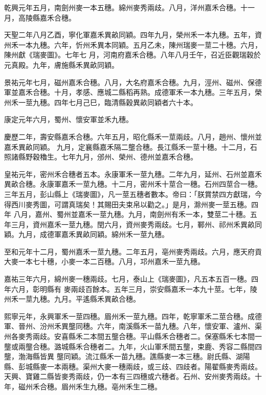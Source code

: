\begin{pinyinscope}
 乾興元年五月，南劍州麥一本五穗。綿州麥秀兩歧。八月，洋州嘉禾合穗。十一月，高陵縣嘉禾合穗。



 天聖二年八月乙酉，寧化軍嘉禾異畝同穎。四年九月，榮州禾一本九穗。五年，資州禾一本九穗。六年，忻州禾異本同穎。五月乙未，陳州瑞麥一莖二十穗。六月，陳州獻《瑞麥圖》。七年七
 月，河南府嘉禾合穗。八年八月壬午，召近臣觀瑞穀於元真殿。九年，膚施縣禾異畝同穎。



 景祐元年七月，磁州嘉禾合穗。八月，大名府嘉禾合穗。九月，涇州、磁州、保德軍並嘉禾合穗。十月，孝感、應城二縣稻再熟。成德軍禾一本九穗。三年五月，榮州禾一莖九穗。四年七月己巳，臨清縣穀異畝同穎者六十本。



 康定元年六月，蜀州、懷安軍並禾九穗。



 慶歷二年，壽安縣嘉禾合穗。六年五月，昭化縣禾一莖兩歧。八月，趙州、懷州並嘉禾異畝同穎。
 九月，定襄縣嘉禾隔二壟合穗。長江縣禾一莖十穗。十二月，石照諸縣野穀穭生。七年九月，邠州、榮州、德州並嘉禾合穗。



 皇祐元年，密州禾合穗者五本。永康軍禾一莖九穗。二年九月，延州、石州並嘉禾異畝合穗。永康軍嘉禾一莖九穗。十二月，密州禾十莖合一穗。石州四莖合一穗。三年五月，彭山縣上《瑞麥圖》，凡一莖五穗者數本。帝曰：「朕賞禁四方獻瑞，今得西川麥秀圖，可謂真瑞矣！其賜田夫束帛以勸之。」是月，滁州麥一莖五穗。四年
 八月，嘉州、蜀州並嘉禾一莖九穗。九月，南劍州有禾一本，雙莖二十穗。五年三月，資州嘉禾一莖九穗。閏六月，資州麥秀兩歧。七月，鄆州、祁州禾異畝同穎。九月，成德軍嘉禾異畝同穎。綿州禾一莖九穗。



 至和元年十二月，蜀州嘉禾一莖九穗。二年五月，亳州麥秀兩歧。六月，應天府貢大麥一本七十穗，小麥一本二百穗。八月，邛州嘉禾一莖九穗。



 嘉祐三年六月，綿州麥一穗兩歧。七月，泰山上《瑞麥圖》，凡五本五百一穗。四年六月，彰明縣有
 麥兩歧百餘本。五年三月，崇安縣嘉禾一本九十莖。七年，陵州禾一莖九穗。九月。平遙縣禾異畝合穗。



 熙寧元年，永興軍禾一莖四穗。眉州禾一莖九穗。四年，乾寧軍禾二莖合穗。成德軍、晉州、汾州禾異壟同穗。六年，南溪縣禾一苗九穗。八年，懷安軍、瀘州、渠州各麥秀兩歧。安喜縣禾二本間五壟合穗。平山縣禾合穗者二。保塞縣禾七本間一壟或兩壟合穗。潞城縣禾合穗者二。九年，火山軍禾間五壟，束鹿、秀容二縣間四壟，渤海縣皆異
 壟同穎。流江縣禾一苗九穗。譙縣麥一本三穗。尉氏縣、湖陽縣、彭城縣麥一本兩穗。渠州大麥一穗兩歧，或三歧、四歧者。陽翟縣麥秀兩歧。天興、寶雞二縣皆麥秀兩歧，仍一本有三四穗或六穗者。石州、安州麥秀兩歧。十年，磁州禾合穗。眉州禾生九穗。亳州禾生二穗。




\end{pinyinscope}
